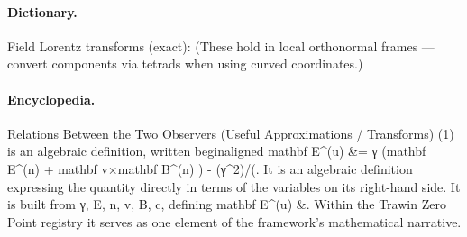 \paragraph{Dictionary.}
Field Lorentz transforms (exact): (These hold in local orthonormal frames — convert components via tetrads when using curved coordinates.)

\paragraph{Encyclopedia.}
Relations Between the Two Observers (Useful Approximations / Transforms) (1) is an algebraic definition, written beginaligned mathbf E\textasciicircum{}(u) \&= γ (mathbf E\textasciicircum{}(n) + mathbf v×mathbf B\textasciicircum{}(n) ) - (γ\textasciicircum{}2)/(. It is an algebraic definition expressing the quantity directly in terms of the variables on its right-hand side. It is built from γ, E, n, v, B, c, defining mathbf E\textasciicircum{}(u) \&. Within the Trawin Zero Point registry it serves as one element of the framework's mathematical narrative.
